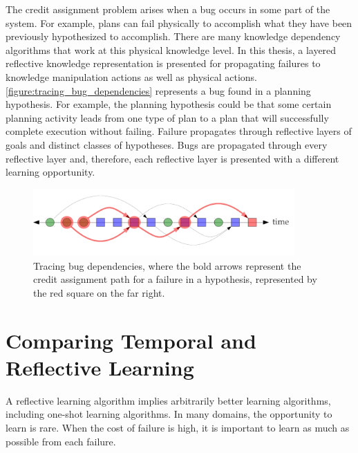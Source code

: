 The credit assignment problem arises when a bug occurs in some part of
the system.  For example, plans can fail physically to accomplish what
they have been previously hypothesized to accomplish.  There are many
knowledge dependency algorithms that work at this physical knowledge
level.  In this thesis, a layered reflective knowledge representation
is presented for propagating failures to knowledge manipulation
actions as well as physical actions.
{\mbox{\autoref{figure:tracing_bug_dependencies}}} represents a bug
found in a planning hypothesis.  For example, the planning hypothesis
could be that some certain planning activity leads from one type of
plan to a plan that will successfully complete execution without
failing.  Failure propagates through reflective layers of goals and
distinct classes of hypotheses.  Bugs are propagated through every
reflective layer and, therefore, each reflective layer is presented
with a different learning opportunity.
\begin{figure}
\center
\includegraphics[width=10cm]{gfx/tracing_bug_dependencies}
\caption[Tracing bug dependencies.]{Tracing bug dependencies, where
  the bold arrows represent the credit assignment path for a failure
  in a hypothesis, represented by the red square on the far right.}
\label{figure:tracing_bug_dependencies}
\end{figure}

\section{Comparing Temporal and Reflective Learning}

A reflective learning algorithm implies arbitrarily better learning
algorithms, including one-shot learning algorithms.  In many domains,
the opportunity to learn is rare.  When the cost of failure is high,
it is important to learn as much as possible from each failure.

